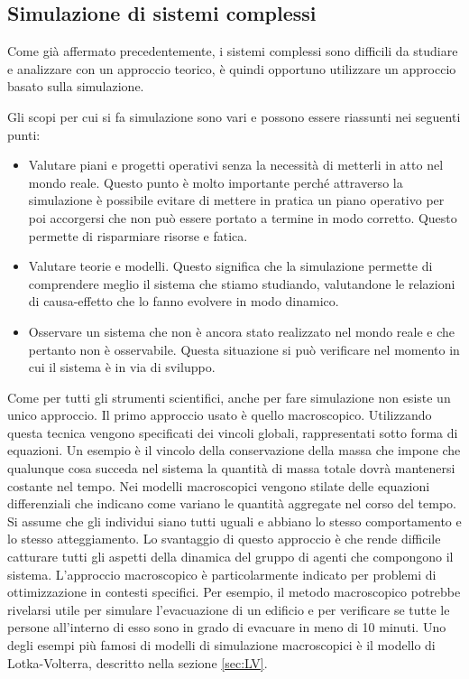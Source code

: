 \documentclass[11pt]{article}
\begin{document}
\subsection{Simulazione di sistemi complessi}
Come già affermato precedentemente, i sistemi complessi sono difficili da studiare e analizzare con un approccio teorico, è quindi opportuno utilizzare un approccio basato sulla simulazione. 

Gli scopi per cui si fa simulazione sono vari e possono essere riassunti nei seguenti punti:
\begin{itemize}
    \item Valutare piani e progetti operativi senza la necessità di metterli in atto nel mondo reale. Questo punto è molto importante perché attraverso la simulazione è possibile evitare di mettere in pratica un piano operativo per poi accorgersi che non può essere portato a termine in modo corretto. Questo permette di risparmiare risorse e fatica.
    \item Valutare teorie e modelli. Questo significa che la simulazione permette di comprendere meglio il sistema che stiamo studiando, valutandone le relazioni di causa-effetto che lo fanno evolvere in modo dinamico.
    \item Osservare un sistema che non è ancora stato realizzato nel mondo reale e che pertanto non è osservabile. Questa situazione si può verificare nel momento in cui il sistema è in via di sviluppo.
\end{itemize}

Come per tutti gli strumenti scientifici, anche per fare simulazione non esiste un unico approccio. Il primo approccio usato è quello macroscopico. Utilizzando questa tecnica vengono specificati dei vincoli globali, rappresentati sotto forma di equazioni. Un esempio è il vincolo della conservazione della massa che impone che qualunque cosa succeda nel sistema la quantità di massa totale dovrà mantenersi costante nel tempo. Nei modelli macroscopici vengono stilate delle equazioni differenziali che indicano come variano le quantità aggregate nel corso del tempo. Si assume che gli individui siano tutti uguali e abbiano lo stesso comportamento e lo stesso atteggiamento. Lo svantaggio di questo approccio è che rende difficile catturare tutti gli aspetti della dinamica del gruppo di agenti che compongono il sistema. L'approccio macroscopico è particolarmente indicato per problemi di ottimizzazione in contesti specifici. Per esempio, il metodo macroscopico potrebbe rivelarsi utile per simulare l'evacuazione di un edificio e per verificare se tutte le persone all'interno di esso sono in grado di evacuare in meno di 10 minuti.
Uno degli esempi più famosi di modelli di simulazione macroscopici è il modello di Lotka-Volterra, descritto nella sezione \ref{sec:LV}. 
\end{document}

